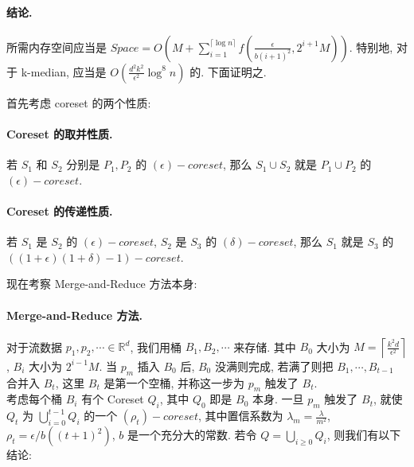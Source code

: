 \documentclass[UTF8]{article}
\newcommand{\jumpLine} {\hspace*{\fill} \par}
\begin{document}
\paragraph{结论.} 所需内存空间应当是 $Space = O\left(M + \sum\limits_{i=1}^{\lceil\log n\rceil} f\left(\frac{\epsilon}{b(i+1)^2}, 2^{i+1} M\right)\right)$. 特别地, 对于 k-median, 应当是 $O\left(\frac{d^2k^2}{\epsilon^2}\log^8n\right)$ 的. 下面证明之.
\\\jumpLine\noindent
首先考虑 coreset 的两个性质:
\paragraph{Coreset 的取并性质.} 若 $S_1$ 和 $S_2$ 分别是 $P_1, P_2$ 的 $( \epsilon)-coreset$, 那么 $S_1 \cup S_2$ 就是 $P_1 \cup P_2$ 的 $(\epsilon)-coreset$.
\paragraph{Coreset 的传递性质.} 若 $S_1$ 是 $S_2$ 的 $(\epsilon)-coreset$, $S_2$ 是 $S_3$ 的 $(\delta)-coreset$, 那么 $S_1$ 就是 $S_3$ 的 $((1 + \epsilon)(1+\delta)-1)-coreset$.
\\\jumpLine\noindent
现在考察 Merge-and-Reduce 方法本身:
\paragraph{Merge-and-Reduce 方法.} 对于流数据 $p_1, p_2, \cdots \in \mathbb{R}^d$, 我们用桶 $B_1, B_2, \cdots$ 来存储. 其中 $B_0$ 大小为 $M=\left\lceil \frac{k^2d}{\epsilon^2} \right\rceil$, $B_i$ 大小为 $2^{i-1}M$. 当 $p_m$ 插入 $B_0$ 后, $B_0$ 没满则完成, 若满了则把 $B_1, \cdots, B_{t-1}$ 合并入 $B_t$, 这里 $B_t$ 是第一个空桶, 并称这一步为 $p_m$ 触发了 $B_t$.
\\
考虑每个桶 $B_i$ 有个 Coreset $Q_i$, 其中 $Q_0$ 即是 $B_0$ 本身. 一旦 $p_m$ 触发了 $B_t$, 就使 $Q_t$ 为 $\bigcup\limits_{i=0}^{t-1}Q_i$ 的一个 $(\rho_t)-coreset$, 其中置信系数为 $\lambda_m=\frac{\lambda}{m^2}$, $\rho_{t}=\epsilon /b((t+1)^2)$, $b$ 是一个充分大的常数. 若令 $Q=\bigcup\limits_{i\ge 0} Q_i$, 则我们有以下结论:
\end{document}

